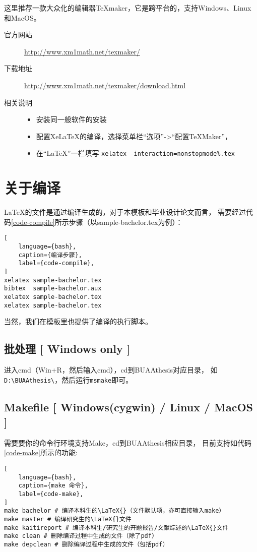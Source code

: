 这里推荐一款大众化的编辑器\TeX{}maker，它是跨平台的，支持Windows、Linux和MacOS。

\begin{description}
    \item[官方网站]
        \url{http://www.xm1math.net/texmaker/}
    \item[下载地址]
        \url{http://www.xm1math.net/texmaker/download.html}
    \item[相关说明]
    \begin{itemize}
        \item 安装同一般软件的安装
        \item 配置Xe\LaTeX{}的编译，选择菜单栏“选项”->“配置\TeX{}Maker”，
        \item[] 在“\LaTeX{}”一栏填写
            \texttt{xelatex -interaction=nonstopmode\%.tex}
    \end{itemize}
\end{description}

\section{关于编译}

\LaTeX{}的文件是通过编译生成的，对于本模板和毕业设计论文而言，
需要经过代码\ref{code-compile}所示步骤（以sample-bachelor.tex为例）：
\begin{lstlisting}[
    language={bash},
    caption={编译步骤},
    label={code-compile},
]
xelatex sample-bachelor.tex
bibtex  sample-bachelor.aux
xelatex sample-bachelor.tex
xelatex sample-bachelor.tex
\end{lstlisting}
当然，我们在模板里也提供了编译的执行脚本。

\subsection{批处理 [ Windows only ]}

进入cmd（Win+R，然后输入cmd），cd到BUAAthesis对应目录，
如\verb|D:\BUAAthesis\|，然后运行\verb|msmake|即可。

\subsection{Makefile [ Windows(cygwin) / Linux / MacOS ]}
需要要你的命令行环境支持Make，cd到BUAAthesis相应目录，
目前支持如代码\ref{code-make}所示的功能:
\begin{lstlisting}[
    language={bash},
    caption={make 命令},
    label={code-make},
]
make bachelor # 编译本科生的\LaTeX{}（文件默认项，亦可直接输入make）
make master # 编译研究生的\LaTeX{}文件
make kaitireport # 编译本科生/研究生的开题报告/文献综述的\LaTeX{}文件
make clean # 删除编译过程中生成的文件（除了pdf）
make depclean # 删除编译过程中生成的文件（包括pdf）
\end{lstlisting}
